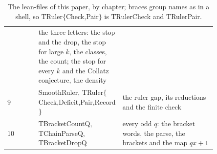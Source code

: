 \documentclass[10pt,a4paper,titlepage]{article}
\newcommand{\lean}[1]{\textsf{#1}}
\begin{document}
\begin{table}[htbp]
\begin{tabular}{@{}l>{\raggedright\arraybackslash}p{0.40\linewidth}>{\raggedright\arraybackslash}p{0.45\linewidth}@{}}
  & the three letters: the stop and the drop, the stop for large $k$, the classes, the count;
  the stop for every $k$ and the Collatz conjecture, the density \\
9 & \lean{SmoothRuler}, \lean{TRuler$\{$Check,Deficit,Pair,Record$\}$}
  & the ruler gap, its reductions and the finite check \\
10 & \lean{TBracketCountQ}, \lean{TChainParseQ}, \lean{TBracketDropQ}
  & every odd $q$: the bracket words, the parse, the brackets and the map $qx + 1$ \\
\bottomrule
\end{tabular}
\caption{The lean-files of this paper, by chapter; braces group names as in a shell, so
\lean{TRuler$\{$Check,Pair$\}$} is \lean{TRulerCheck} and \lean{TRulerPair}.}
\label{tab:lean3}
\end{table}
\end{document}
